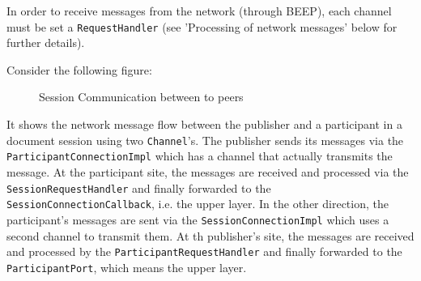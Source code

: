 In order to receive messages from the network (through BEEP), each channel must be set a \texttt{RequestHandler} (see 'Processing of network messages' below for further details).

Consider the following figure:

\begin{figure}[H]
 \centering
 \caption{Session Communication between to peers}
 \label{fig:network.protocol.requestcommunication}
\end{figure}

It shows the network message flow between the publisher and a participant in a document session using two \texttt{Channel}'s. The publisher sends its messages via the \texttt{ParticipantConnectionImpl} which has a channel that actually transmits the message. At the participant site, the messages are received and processed via the \texttt{Session\-Request\-Handler} and finally forwarded to the \texttt{Session\-Connection\-Callback}, i.e. the upper layer. In the other direction, the participant's messages are sent via the \texttt{SessionConnectionImpl} which uses a second channel to transmit them. At th publisher's site, the messages are received and processed by the \texttt{ParticipantRequestHandler} and finally forwarded to the \texttt{ParticipantPort}, which means the upper layer.

